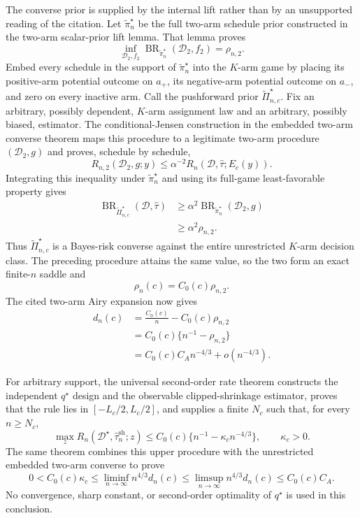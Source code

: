 The converse prior is supplied by the internal lift rather than by an unsupported reading of the citation. Let \(\widetilde\pi_n^\star\) be the full two-arm schedule prior constructed in the two-arm scalar-prior lift lemma. That lemma proves
\[
 \inf_{\mathcal D_2,f_2}
 \operatorname{BR}_{\widetilde\pi_n^\star}(\mathcal D_2,f_2)
 =\rho_{n,2}.
\]
Embed every schedule in the support of \(\widetilde\pi_n^\star\) into the \(K\)-arm game by placing its positive-arm potential outcome on \(a_+\), its negative-arm potential outcome on \(a_-\), and zero on every inactive arm. Call the pushforward prior \(\widetilde\Pi_{n,c}^\star\). Fix an arbitrary, possibly dependent, \(K\)-arm assignment law and an arbitrary, possibly biased, estimator. The conditional-Jensen construction in the embedded two-arm converse theorem maps this procedure to a legitimate two-arm procedure \((\mathcal D_2,g)\) and proves, schedule by schedule,
\[
 R_{n,2}(\mathcal D_2,g;y)
 \leq \alpha^{-2}R_n(\mathcal D,\widehat\tau;E_c(y)).
\]
Integrating this inequality under \(\widetilde\pi_n^\star\) and using its full-game least-favorable property gives
\[
 \begin{aligned}
 \operatorname{BR}_{\widetilde\Pi_{n,c}^\star}(\mathcal D,\widehat\tau)
 &\geq \alpha^2
 \operatorname{BR}_{\widetilde\pi_n^\star}(\mathcal D_2,g)\\
 &\geq \alpha^2\rho_{n,2}.
 \end{aligned}
\]
Thus \(\widetilde\Pi_{n,c}^\star\) is a Bayes-risk converse against the entire unrestricted \(K\)-arm decision class. The preceding procedure attains the same value, so the two form an exact finite-\(n\) saddle and
\[
 \rho_n(c)=C_0(c)\rho_{n,2}.
\]
The cited two-arm Airy expansion now gives
\[
 \begin{aligned}
 d_n(c)
 &=\frac{C_0(c)}n-C_0(c)\rho_{n,2}\\
 &=C_0(c)\{n^{-1}-\rho_{n,2}\}\\
 &=C_0(c)C_A n^{-4/3}+o(n^{-4/3}).
 \end{aligned}
\]

For arbitrary support, the universal second-order rate theorem constructs the independent \(q^\star\) design and the observable clipped-shrinkage estimator, proves that the rule lies in \([-L_c/2,L_c/2]\), and supplies a finite \(N_c\) such that, for every \(n\geq N_c\),
\[
 \max_zR_n(\mathcal D^\star,\widehat\tau_n^{\mathrm{sh}};z)
 \leq C_0(c)\{n^{-1}-\kappa_cn^{-4/3}\},
 \qquad \kappa_c>0.
\]
The same theorem combines this upper procedure with the unrestricted embedded two-arm converse to prove
\[
 0<C_0(c)\kappa_c
 \leq\liminf_{n\to\infty}n^{4/3}d_n(c)
 \leq\limsup_{n\to\infty}n^{4/3}d_n(c)
 \leq C_0(c)C_A.
\]
No convergence, sharp constant, or second-order optimality of \(q^\star\) is used in this conclusion.

